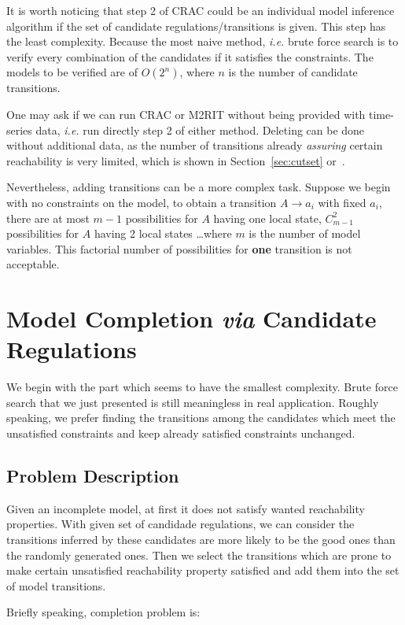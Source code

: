 It is worth noticing that step 2 of CRAC could be an individual model inference algorithm if the set of candidate regulations/transitions is given.
This step has the least complexity.
Because the most naive method, \textit{i.e.} brute force search is to verify every combination of the candidates if it satisfies the constraints. 
The models to be verified are of $O(2^n)$, where $n$ is the number of candidate transitions.

One may ask if we can run CRAC or M2RIT without being provided with time-series data, \textit{i.e.} run directly step 2 of either method.
Deleting can be done without additional data, as the number of transitions already \textit{assuring} certain reachability is very limited, which is shown in Section~\ref{sec:cutset} or~\cite{PAK13-CAV}.

Nevertheless, adding transitions can be a more complex task.
Suppose we begin with no constraints on the model, to obtain a transition $A\to a_i$ with fixed $a_i$, there are at most $m-1$ possibilities for $A$ having one local state, $C_{m-1}^2$ possibilities for $A$ having 2 local states \ldots where $m$ is the number of model variables.
This factorial number of possibilities for \textbf{one} transition is not acceptable.

\section{Model Completion \textit{via} Candidate Regulations}\label{sec:modelInference}
We begin with the part which seems to have the smallest complexity.
Brute force search that we just presented is still meaningless in real application.
Roughly speaking, we prefer finding the transitions among the candidates which meet the unsatisfied constraints and keep already satisfied constraints unchanged.

\subsection{Problem Description}
Given an incomplete model, at first it does not satisfy wanted reachability properties.
With given set of candidade regulations, we can consider the transitions inferred by these candidates are more likely to be the good ones than the randomly generated ones.
Then we select the transitions which are prone to make certain unsatisfied reachability property satisfied and add them into the set of model transitions.

Briefly speaking, completion problem is:

